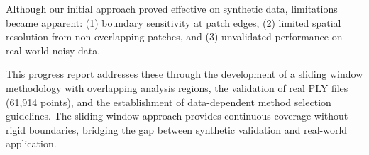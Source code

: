\documentclass[../main.tex]{subfiles}
\begin{document}
Although our initial approach proved effective on synthetic data, limitations became apparent: (1) boundary sensitivity at patch edges, (2) limited spatial resolution from non-overlapping patches, and (3) unvalidated performance on real-world noisy data. 

This progress report addresses these through the development of a sliding window methodology with overlapping analysis regions, the validation of real PLY files (61,914 points), and the establishment of data-dependent method selection guidelines. The sliding window approach provides continuous coverage without rigid boundaries, bridging the gap between synthetic validation and real-world application.
\end{document}
